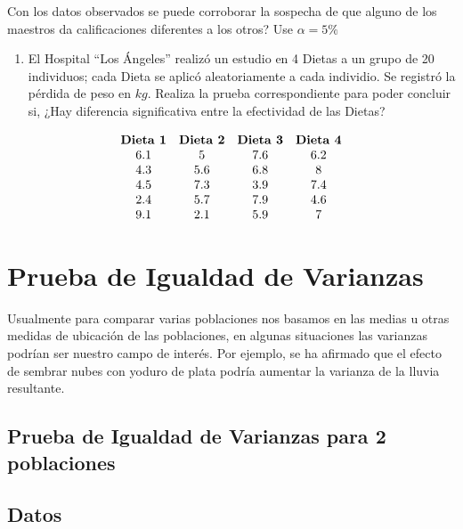 \documentclass[
  a4paper,
  oneside,
  openany]{book}
\providecommand{\tightlist}{%
  \setlength{\itemsep}{0pt}\setlength{\parskip}{0pt}}
\begin{document}
Con los datos observados se puede corroborar la sospecha de que alguno de los maestros da calificaciones diferentes a los otros? Use \(\alpha=5\%\)

\begin{enumerate}
\def\labelenumi{\arabic{enumi}.}
\setcounter{enumi}{2}
\tightlist
\item
  El Hospital ``Los Ángeles'' realizó un estudio en 4 Dietas a un grupo de 20 individuos; cada Dieta se aplicó aleatoriamente a cada individio. Se registró la pérdida de peso en \(kg\).
  Realiza la prueba correspondiente para poder concluir si, ¿Hay diferencia significativa entre la efectividad de las Dietas?
\end{enumerate}

\[
\begin{array}{c c c c} 
\textbf{Dieta 1} & \textbf{Dieta 2} & \textbf{Dieta 3} & \textbf{Dieta 4}\\
6.1&5&7.6&6.2\\
4.3&5.6&6.8&8\\
4.5&7.3&3.9&7.4\\
2.4&5.7&7.9&4.6\\
9.1&2.1&5.9&7\\
\end{array}
\]

\hypertarget{prueba-de-igualdad-de-varianzas}{%
\chapter{Prueba de Igualdad de Varianzas}\label{prueba-de-igualdad-de-varianzas}}

Usualmente para comparar varias poblaciones nos basamos en las medias u otras medidas de ubicación de las poblaciones, en algunas situaciones las varianzas podrían ser nuestro campo de interés. Por ejemplo, se ha afirmado que el efecto de sembrar nubes con yoduro de plata podría aumentar la varianza de la lluvia resultante.

\hypertarget{prueba-de-igualdad-de-varianzas-para-2-poblaciones}{%
\section*{Prueba de Igualdad de Varianzas para 2 poblaciones}\label{prueba-de-igualdad-de-varianzas-para-2-poblaciones}}


\hypertarget{datos-8}{%
\section{Datos}\label{datos-8}}
\end{document}
